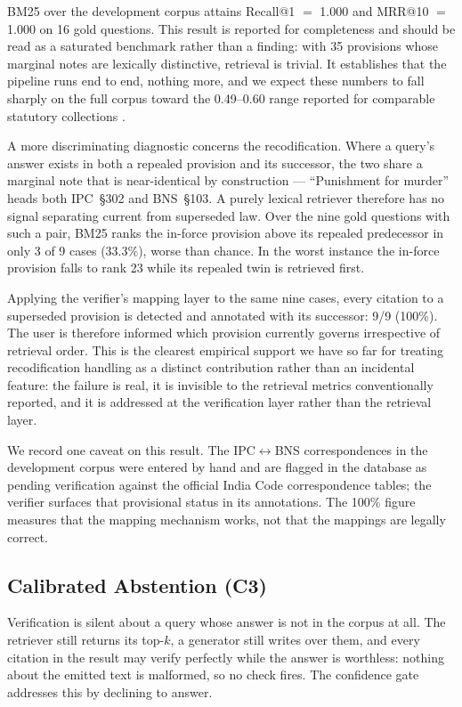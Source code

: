 \documentclass[conference]{IEEEtran}
\begin{document}
BM25 over the development corpus attains Recall@1 $=$ 1.000 and MRR@10 $=$
1.000 on 16 gold questions. This result is reported for completeness and should
be read as a saturated benchmark rather than a finding: with 35 provisions whose
marginal notes are lexically distinctive, retrieval is trivial. It establishes
that the pipeline runs end to end, nothing more, and we expect these numbers to
fall sharply on the full corpus toward the 0.49--0.60 range reported for
comparable statutory collections \cite{rustamov2025}.

A more discriminating diagnostic concerns the recodification. Where a query's
answer exists in both a repealed provision and its successor, the two share a
marginal note that is near-identical by construction --- ``Punishment for
murder'' heads both IPC~\S302 and BNS~\S103. A purely lexical retriever
therefore has no signal separating current from superseded law. Over the nine
gold questions with such a pair, BM25 ranks the in-force provision above its
repealed predecessor in only 3 of 9 cases (33.3\%), worse than chance. In the
worst instance the in-force provision falls to rank 23 while its repealed twin
is retrieved first.

Applying the verifier's mapping layer to the same nine cases, every citation to
a superseded provision is detected and annotated with its successor: 9/9
(100\%). The user is therefore informed which provision currently governs
irrespective of retrieval order. This is the clearest empirical support we have
so far for treating recodification handling as a distinct contribution rather
than an incidental feature: the failure is real, it is invisible to the
retrieval metrics conventionally reported, and it is addressed at the
verification layer rather than the retrieval layer.

We record one caveat on this result. The IPC$\leftrightarrow$BNS
correspondences in the development corpus were entered by hand and are flagged
in the database as pending verification against the official India Code
correspondence tables; the verifier surfaces that provisional status in its
annotations. The 100\% figure measures that the mapping mechanism works, not
that the mappings are legally correct.

\subsection{Calibrated Abstention (C3)}
\label{ssec:confidence}

Verification is silent about a query whose answer is not in the corpus at all.
The retriever still returns its top-$k$, a generator still writes over them, and
every citation in the result may verify perfectly while the answer is worthless:
nothing about the emitted text is malformed, so no check fires. The confidence
gate addresses this by declining to answer.
\end{document}
